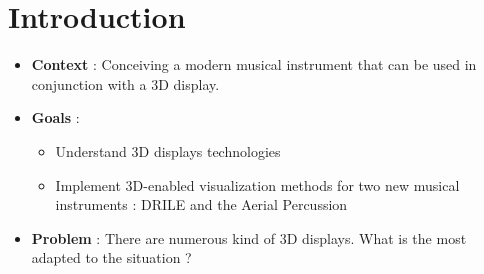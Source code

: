 \section{Introduction}
\begin{frame}
  \begin{itemize}
  \item \textbf{Context} : Conceiving a modern musical instrument that can be used in conjunction with a 3D display.

  \item{\textbf{Goals} :
    \begin{itemize}
    \item Understand 3D displays technologies
    \item Implement 3D-enabled visualization methods for two new musical instruments : DRILE and the Aerial Percussion
    \end{itemize}
  }

  \item{\textbf{Problem} : There are numerous kind of 3D displays. What is the most adapted to the situation ?}
  \end{itemize}
\end{frame}
